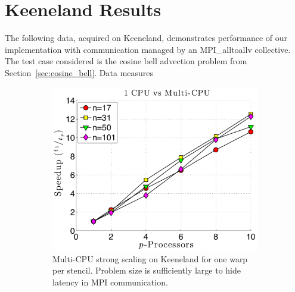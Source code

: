 
\chapter{Keeneland Results}




The following data, acquired on Keeneland, demonstrates performance of our implementation with communication managed by an MPI\_alltoallv collective. The test case considered is the cosine bell advection problem from Section~\ref{sec:cosine_bell}. Data measures  

\begin{figure}
\centering
\begin{subfigure}[t]{0.425\textwidth}
\centering
\includegraphics[width=1.0\textwidth]{../figures/keeneland_results/alltoallv/speedup_1CPU_vs_NCPU.pdf}
\caption{Multi-CPU strong scaling on Keeneland for one warp per stencil. Problem size is sufficiently large to hide latency in MPI communication.}
\label{fig:alltoall_multicpu_scaling}
\end{subfigure} 
\begin{subfigure}[t]{0.425\textwidth}
\centering

\end{subfigure}
\end{figure}
